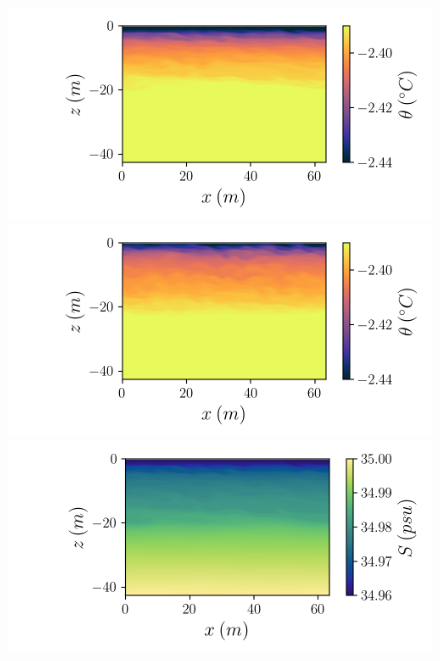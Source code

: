 \documentclass[draft]{styles/agujournal2019}
\begin{document}
\begin{figure}[]
    \centering
    \begin{minipage}{0.45\textwidth}
        \includegraphics[trim={1cm 0 3cm 0},clip,width=\textwidth]{Figures/pt_slope01_xz_y64_zmax42_t40.png}
    \end{minipage}%
    \begin{minipage}{0.55\textwidth}
        \includegraphics[trim={1.5cm 0 0.5cm 0},clip,width=\textwidth]{Figures/pt_slope1_xz_y64_zmax42_t40.png}
    \end{minipage}
    \begin{minipage}{0.45\textwidth}
        \includegraphics[trim={1cm 0 3cm 0}, clip, width=\textwidth]{Figures/sa_slope01_xz_y64_zmax42_t40.png}

\end{minipage}
\end{figure}
\end{document}
